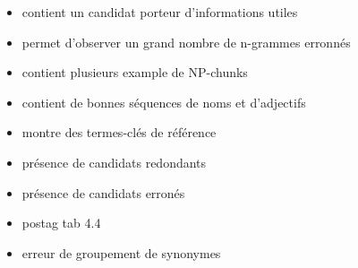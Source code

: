 \begin{itemize}
  \item{contient un candidat porteur d'informations utiles}
  \item{permet d'observer un grand nombre de n-grammes erronnés}
  \item{contient plusieurs example de NP-chunks}
  \item{contient de bonnes séquences de noms et d'adjectifs}
  \item{montre des termes-clés de référence}
  \item{présence de candidats redondants}
  \item{présence de candidats erronés}
  \item{postag tab 4.4}
  \item{erreur de groupement de synonymes}
\end{itemize}
